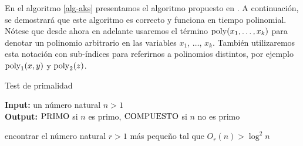 En el algoritmo \ref{alg-aks} presentamos el algoritmo propuesto en \cite{AKS04}. 
A continuación, se demostrará que este algoritmo es correcto y funciona en tiempo polinomial. Nótese que desde ahora en adelante usaremos el término ${\rm poly}(x_1, \ldots, x_k)$ para denotar un  polinomio arbitrario en las variables $x_1$, $\ldots$, $x_k$. También utilizaremos esta notación con sub-índices para referirnos a polinomios distintos, por ejemplo ${\rm poly}_1(x,y)$ y ${\rm poly}_2(z)$. 


\begin{algorithm}[h]
\caption{\quad Test de primalidad \AKS}
\label{alg-aks}
\hspace*{\algorithmicindent} \textbf{Input:} un número natural $n>1$\\
\hspace*{\algorithmicindent} \textbf{Output:} $\text{\rm PRIMO}$ si $n$ es primo, $\text{\rm COMPUESTO}$ si $n$ no es primo
\begin{algorithmic}[1]
   \label{alg-1} 
      \RETURN \COMPUESTO \label{alg-r1}
   \ELSE
      \STATE encontrar el número natural $r > 1$ más pequeño tal que $O_r(n)>\log ^2n$ \label{alg-2}
       \label{alg-3}
        		\RETURN \COMPUESTO \label{alg-r3}
      \ELSE
          \label{alg-4}
         \RETURN \PRIMO \label{alg-r4}
         \ELSE
             \label{alg-5-for}
            	 \label{alg-5}
	           \RETURN \COMPUESTO \label{alg-r5}
	        \ENDIF
            \ENDFOR
            \RETURN \PRIMO \label{alg-6}
         \ENDIF
      \ENDIF      
   \ENDIF
\end{algorithmic}
\end{algorithm}
	
	
